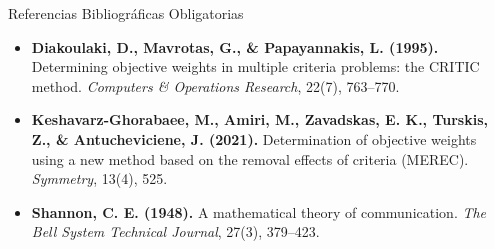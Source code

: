 \documentclass[aspectratio=169, 10pt]{beamer}
\begin{document}
\begin{frame}{Referencias Bibliográficas Obligatorias}
    \begin{itemize}
        \scriptsize
        \item \textbf{Diakoulaki, D., Mavrotas, G., \& Papayannakis, L. (1995).} Determining objective weights in multiple criteria problems: the CRITIC method. \textit{Computers \& Operations Research}, 22(7), 763--770.
        \item \textbf{Keshavarz-Ghorabaee, M., Amiri, M., Zavadskas, E. K., Turskis, Z., \& Antucheviciene, J. (2021).} Determination of objective weights using a new method based on the removal effects of criteria (MEREC). \textit{Symmetry}, 13(4), 525.
        \item \textbf{Shannon, C. E. (1948).} A mathematical theory of communication. \textit{The Bell System Technical Journal}, 27(3), 379--423.
    \end{itemize}
\end{frame}
\end{document}
